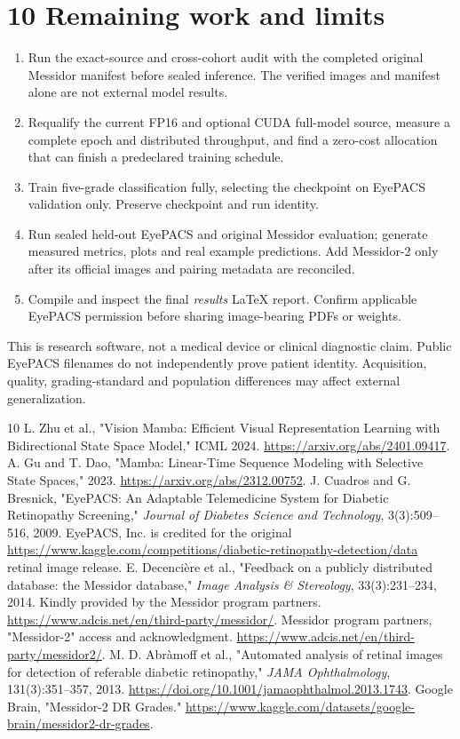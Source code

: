 \documentclass[10pt,a4paper]{article}
\begin{document}
\section*{\color{ink}10 \quad Remaining work and limits}
\begin{enumerate}
\item Run the exact-source and cross-cohort audit with the completed original
Messidor manifest before sealed inference. The verified images and manifest
alone are not external model results.
\item Requalify the current FP16 and optional CUDA full-model source,
measure a complete epoch and distributed throughput, and find a zero-cost
allocation that can finish a predeclared training schedule.
\item Train five-grade classification fully, selecting the checkpoint on
EyePACS validation only. Preserve checkpoint and run identity.
\item Run sealed held-out EyePACS and original Messidor evaluation; generate
measured metrics, plots and real example predictions. Add Messidor-2 only
after its official images and pairing metadata are reconciled.
\item Compile and inspect the final \emph{results} LaTeX report. Confirm
applicable EyePACS permission before sharing image-bearing PDFs or weights.
\end{enumerate}
This is research software, not a medical device or clinical diagnostic
claim. Public EyePACS filenames do not independently prove patient identity.
Acquisition, quality, grading-standard and population differences may
affect external generalization.

\begin{thebibliography}{10}\small
{} L. Zhu et al., "Vision Mamba: Efficient Visual Representation
Learning with Bidirectional State Space Model," ICML 2024.
\url{https://arxiv.org/abs/2401.09417}.
 A. Gu and T. Dao, "Mamba: Linear-Time Sequence Modeling
with Selective State Spaces," 2023.
\url{https://arxiv.org/abs/2312.00752}.
 J. Cuadros and G. Bresnick, "EyePACS: An Adaptable
Telemedicine System for Diabetic Retinopathy Screening," \emph{Journal of
Diabetes Science and Technology}, 3(3):509--516, 2009. EyePACS, Inc. is
credited for the original
\url{https://www.kaggle.com/competitions/diabetic-retinopathy-detection/data}
retinal image release.
 E. Decencière et al., "Feedback on a publicly
distributed database: the Messidor database," \emph{Image Analysis \&
Stereology}, 33(3):231--234, 2014. Kindly provided by the Messidor
program partners. \url{https://www.adcis.net/en/third-party/messidor/}.
 Messidor program partners, "Messidor-2" access and
acknowledgment. \url{https://www.adcis.net/en/third-party/messidor2/}.
 M. D. Abr\`amoff et al., "Automated analysis of retinal
images for detection of referable diabetic retinopathy," \emph{JAMA
Ophthalmology}, 131(3):351--357, 2013.
\url{https://doi.org/10.1001/jamaophthalmol.2013.1743}.
 Google Brain, "Messidor-2 DR Grades."
\url{https://www.kaggle.com/datasets/google-brain/messidor2-dr-grades}.
\end{thebibliography}

\end{document}
